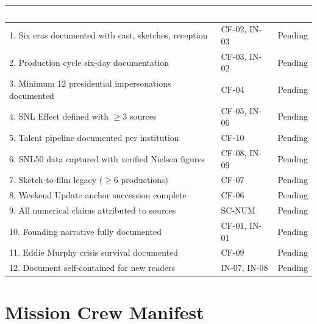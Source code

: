 \documentclass[11pt,letterpaper]{article}
\newcommand{\tableheader}[1]{\textbf{\sffamily\textcolor{white}{#1}}}
\begin{document}
\begin{center}
\begin{tabularx}{\textwidth}{XL{3.5cm}C{1.5cm}}
\toprule
{}
\tableheader{Success Criterion} & \tableheader{Test ID(s)} & \tableheader{Status} \\
. Six eras documented with cast, sketches, reception & CF-02, IN-03 & Pending \\
2. Production cycle six-day documentation & CF-03, IN-02 & Pending \\
3. Minimum 12 presidential impersonations documented & CF-04 & Pending \\
4. SNL Effect defined with $\geq$3 sources & CF-05, IN-06 & Pending \\
5. Talent pipeline documented per institution & CF-10 & Pending \\
6. SNL50 data captured with verified Nielsen figures & CF-08, IN-09 & Pending \\
7. Sketch-to-film legacy ($\geq$6 productions) & CF-07 & Pending \\
8. Weekend Update anchor succession complete & CF-06 & Pending \\
9. All numerical claims attributed to sources & SC-NUM & Pending \\
10. Founding narrative fully documented & CF-01, IN-01 & Pending \\
11. Eddie Murphy crisis survival documented & CF-09 & Pending \\
12. Document self-contained for new readers & IN-07, IN-08 & Pending \\
\bottomrule
\end{tabularx}
\end{center}

\section{Mission Crew Manifest}
\end{document}
